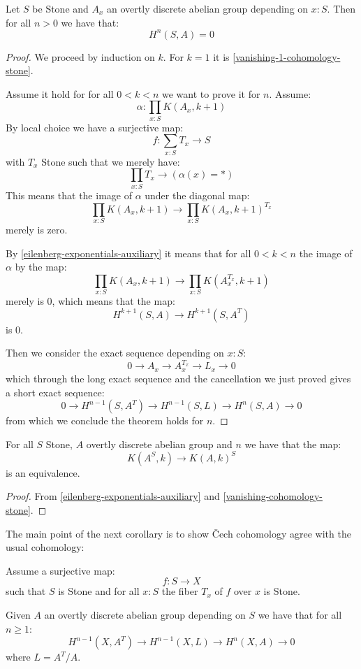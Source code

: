 \begin{theorem}\label{vanishing-cohomology-stone}
Let $S$ be Stone and $A_x$ an overtly discrete abelian group depending on $x:S$. Then for all $n>0$ we have that:
\[H^n(S,A) = 0\]
\end{theorem}

\begin{proof}
We proceed by induction on $k$. For $k=1$ it is \cref{vanishing-1-cohomology-stone}.

Assume it hold for for all $0<k<n$ we want to prove it for $n$. Assume:
\[\alpha : \prod_{x:S} K(A_x,k+1)\]
By local choice we have a surjective map:
\[f:\sum_{x:S}T_x\to S\]
with $T_x$ Stone such that we merely have:
\[\prod_{x:S} T_x\to (\alpha(x) = *)\]
This means that the image of $\alpha$ under the diagonal map:
\[\prod_{x:S} K(A_x,k+1) \to \prod_{x:S} K(A_x,k+1)^{T_x}\]
merely is zero.

By \cref{eilenberg-exponentials-auxiliary} it means that for all $0<k<n$ the image of $\alpha$ by the map:
\[\prod_{x:S} K(A_x,k+1) \to \prod_{x:S} K(A_x^{T_x},k+1)\]
merely is $0$, which means that the map:
\[H^{k+1}(S,A) \to H^{k+1}(S,A^T)\]
is $0$. 

Then we consider the exact sequence depending on $x:S$:
\[0\to A_x\to A_x^{T_x}\to L_x\to 0\]
which through the long exact sequence and the cancellation we just proved gives a short exact sequence:
\[0 \to H^{n-1}(S,A^T) \to H^{n-1}(S,L)\to H^n(S,A)\to 0\]
from which we conclude the theorem holds for $n$.
\end{proof}

\begin{corollary}\label{eilenberg-exponentials}
For all $S$ Stone, $A$ overtly discrete abelian group  and $n$ we have that the map:
\[K(A^S,k) \to K(A,k)^S\]
is an equivalence.
\end{corollary}

\begin{proof}
From \cref{eilenberg-exponentials-auxiliary} and \cref{vanishing-cohomology-stone}.
\end{proof}

The main point of the next corollary is to show \v{C}ech cohomology agree with the usual cohomology:

\begin{lemma}\label{inductive-definition-cohomology}
Assume a surjective map:
\[f:S\to X\]
such that $S$ is Stone and for all $x:S$ the fiber $T_x$ of $f$ over $x$ is Stone.  

Given $A$ an overtly discrete abelian group depending on $S$ we have that for all $n\geq 1$:
\[H^{n-1}(X,A^T) \to H^{n-1}(X,L)\to H^n(X,A)\to 0\]
where $L = A^T/A$.
\end{lemma}

